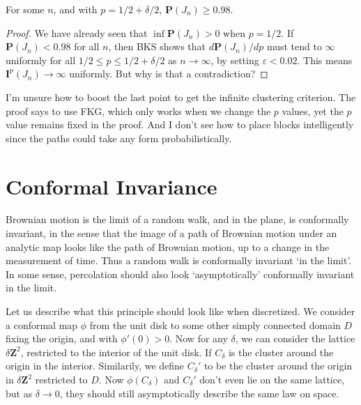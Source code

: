 \begin{lemma}
    For some $n$, and with $p = 1/2 + \delta/2$, $\mathbf{P}(J_n) \geq 0.98$.
\end{lemma}
\begin{proof}
    We have already seen that $\inf \mathbf{P}(J_n) > 0$ when $p = 1/2$. If $\mathbf{P}(J_n) < 0.98$ for all $n$, then BKS shows that $d\mathbf{P}(J_n)/dp$ must tend to $\infty$ uniformly for all $1/2 \leq p \leq 1/2 + \delta/2$ as $n \to \infty$, by setting $\varepsilon < 0.02$. This means $\mathbf{I}^p(J_n) \to \infty$ uniformly. But why is that a contradiction?
\end{proof}

I'm unsure how to boost the last point to get the infinite clustering criterion. The proof says to use FKG, which only works when we change the $p$ values, yet the $p$ value remains fixed in the proof. And I don't see how to place blocks intelligently since the paths could take any form probabilistically.

\section{Conformal Invariance}

Brownian motion is the limit of a random walk, and in the plane, is conformally invariant, in the sense that the image of a path of Brownian motion under an analytic map looks like the path of Brownian motion, up to a change in the measurement of time. Thus a random walk is conformally invariant `in the limit'. In some sense, percolation should also look `asymptotically' conformally invariant in the limit.

Let us describe what this principle should look like when discretized. We consider a conformal map $\phi$ from the unit disk to some other simply connected domain $D$ fixing the origin, and with $\phi'(0) > 0$. Now for any $\delta$, we can consider the lattice $\delta \mathbf{Z}^2$, restricted to the interior of the unit disk. If $C_\delta$ is the cluster around the origin in the interior. Similarily, we define $C_\delta'$ to be the cluster around the origin in $\delta \mathbf{Z}^2$ restricted to $D$. Now $\phi(C_\delta)$ and $C_\delta'$ don't even lie on the same lattice, but as $\delta \to 0$, they should still asymptotically describe the same law on space.

